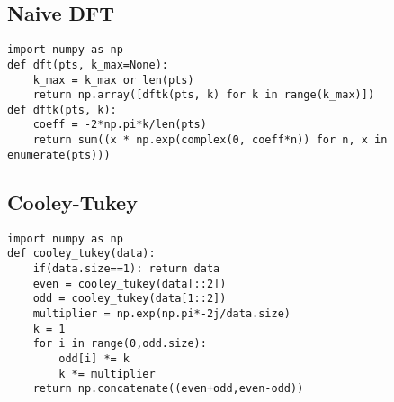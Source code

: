 \lstset{language=Python,basicstyle=\ttfamily}
\subsection{Naive DFT}
	\label{naive_dft_python}
	\begin{lstlisting}
import numpy as np
def dft(pts, k_max=None):
    k_max = k_max or len(pts)
    return np.array([dftk(pts, k) for k in range(k_max)])
def dftk(pts, k):
    coeff = -2*np.pi*k/len(pts)
    return sum((x * np.exp(complex(0, coeff*n)) for n, x in enumerate(pts)))
	\end{lstlisting}
\subsection{Cooley-Tukey}
	\label{cooley_tukey_python}
	\begin{lstlisting}
import numpy as np
def cooley_tukey(data):
    if(data.size==1): return data
    even = cooley_tukey(data[::2])
    odd = cooley_tukey(data[1::2])
    multiplier = np.exp(np.pi*-2j/data.size)
    k = 1
    for i in range(0,odd.size):
        odd[i] *= k
        k *= multiplier
    return np.concatenate((even+odd,even-odd))
	\end{lstlisting}
